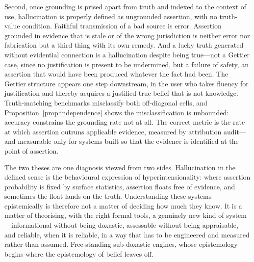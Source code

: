 Second, once grounding is prised apart from truth and indexed to the context of
use, hallucination is properly defined as ungrounded assertion, with no
truth-value condition. Faithful transmission of a bad source is error. Assertion
grounded in evidence that is stale or of the wrong jurisdiction is neither error
nor fabrication but a third thing with its own remedy. And a lucky truth
generated without evidential connection is a hallucination despite being
true---not a Gettier case, since no justification is present to be undermined, but
a failure of safety, an assertion that would have been produced whatever the fact
had been. The Gettier structure appears one step downstream, in the user who
takes fluency for justification and thereby acquires a justified true belief that
is not knowledge. Truth-matching benchmarks misclassify both off-diagonal cells,
and Proposition~\ref{prop:independence} shows the misclassification is
unbounded: accuracy constrains the grounding rate not at all. The correct metric
is the rate at which assertion outruns applicable evidence, measured by
attribution audit---and measurable only for systems built so that the evidence is
identified at the point of assertion.

The two theses are one diagnosis viewed from two sides. Hallucination in the
defined sense is the behavioural expression of hyperintensionality: where
assertion probability is fixed by surface statistics, assertion floats free of
evidence, and sometimes the float lands on the truth. Understanding these systems
epistemically is therefore not a matter of deciding how much they know. It is a
matter of theorising, with the right formal tools, a genuinely new kind of
system---informational without being doxastic, assessable without being
appraisable, and reliable, when it is reliable, in a way that has to be
engineered and measured rather than assumed. Free-standing sub-doxastic engines,
whose epistemology begins where the epistemology of belief leaves off.
